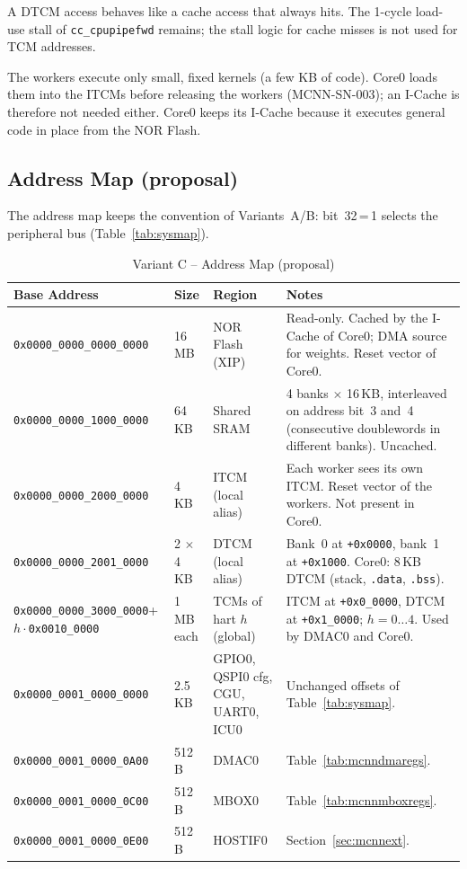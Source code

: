 A DTCM access behaves like a cache access that always hits.
The 1-cycle load-use stall of \texttt{cc\_cpupipefwd} remains; the stall
logic for cache misses is not used for TCM addresses.

The workers execute only small, fixed kernels (a few KB of code).
Core0 loads them into the ITCMs before releasing the workers
(MCNN-SN-003); an I-Cache is therefore not needed either.
Core0 keeps its I-Cache because it executes general code in place from the
NOR Flash.

\subsection{Address Map (proposal)}
\label{subsec:mcnnaddrmap}

The address map keeps the convention of Variants~A/B: bit~32\,=\,1 selects
the peripheral bus (Table~\ref{tab:sysmap}).

\begin{table}[H]
\caption{Variant C -- Address Map (proposal)}
\label{tab:mcnnaddrmap}
\centering
{\scriptsize
\begin{tabularx}{\textwidth}{|p{} |p{} |p{} |X|}
  \hline
  Base Address & Size & Region & Notes \\
  \hline
  \hline
  \texttt{0x0000\_0000\_0000\_0000} & 16\,MB & NOR Flash (XIP) &
    Read-only. Cached by the I-Cache of Core0; DMA source for weights.
    Reset vector of Core0. \\
  \hline
  \texttt{0x0000\_0000\_1000\_0000} & 64\,KB & Shared SRAM &
    4 banks $\times$ 16\,KB, interleaved on address bit~3 and~4
    (consecutive doublewords in different banks). Uncached. \\
  \hline
  \texttt{0x0000\_0000\_2000\_0000} & 4\,KB & ITCM (local alias) &
    Each worker sees its own ITCM. Reset vector of the workers.
    Not present in Core0. \\
  \hline
  \texttt{0x0000\_0000\_2001\_0000} & 2 $\times$ 4\,KB & DTCM (local alias) &
    Bank~0 at \texttt{+0x0000}, bank~1 at \texttt{+0x1000}.
    Core0: 8\,KB DTCM (stack, \texttt{.data}, \texttt{.bss}). \\
  \hline
  \texttt{0x0000\_0000\_3000\_0000}\newline + $h \cdot$\texttt{0x0010\_0000} & 1\,MB each & TCMs of hart $h$ (global) &
    ITCM at \texttt{+0x0\_0000}, DTCM at \texttt{+0x1\_0000};
    $h = 0\ldots4$. Used by DMAC0 and Core0. \\
  \hline
  \texttt{0x0000\_0001\_0000\_0000} & 2.5\,KB & GPIO0, QSPI0 cfg, CGU, UART0, ICU0 &
    Unchanged offsets of Table~\ref{tab:sysmap}. \\
  \hline
  \texttt{0x0000\_0001\_0000\_0A00} & 512\,B & DMAC0 & Table~\ref{tab:mcnndmaregs}. \\
  \hline
  \texttt{0x0000\_0001\_0000\_0C00} & 512\,B & MBOX0 & Table~\ref{tab:mcnnmboxregs}. \\
  \hline
  \texttt{0x0000\_0001\_0000\_0E00} & 512\,B & HOSTIF0 & Section~\ref{sec:mcnnext}. \\
  \hline
\end{tabularx}}
\end{table}

